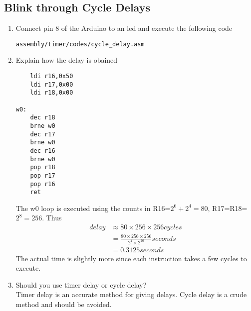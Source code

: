 \subsection{Blink through Cycle Delays}
\begin{enumerate}[label=\arabic*.,ref=\theenumi]
\item Connect pin 8 of the Arduino to an led and execute the following code
\begin{lstlisting}
assembly/timer/codes/cycle_delay.asm
\end{lstlisting}
\item Explain how the delay is obained
\begin{lstlisting}
    ldi r16,0x50
    ldi r17,0x00
    ldi r18,0x00

w0:
    dec r18
    brne w0
    dec r17
    brne w0
    dec r16
    brne w0
    pop r18
    pop r17
    pop r16
    ret
\end{lstlisting}
\solution The w0 loop is executed using the counts in R16=$2^6+2^4 = 80$, R17=R18=$2^8=256$.  Thus 
\begin{align}
delay &\approx 80\times256\times256 cycles
\\
&= \frac{80\times256\times256 }{2^4 \times 2^20} seconds
\\
&=0.3125 seconds
\end{align}
The actual time is slightly more since each instruction takes a few cycles to execute. 
\item Should you use timer delay or cycle delay?
\\
\solution Timer delay is an accurate method for giving delays.  Cycle delay is a crude method and should be avoided.  
\end{enumerate}


